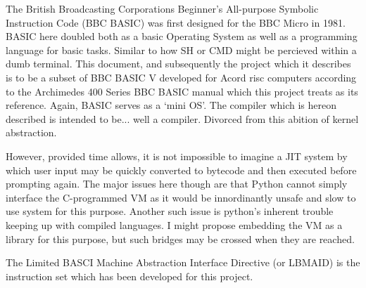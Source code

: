 
The British Broadcasting Corporations Beginner's All-purpose Symbolic Instruction Code (BBC BASIC) was first designed for the BBC Micro in 1981. BASIC
here doubled both as a basic Operating System as well as a programming language for basic tasks. Similar to how SH or CMD might be percieved within a dumb
terminal. This document, and subsequently the project which it describes is to be a subset of BBC BASIC V developed for Acord risc computers according
to the Archimedes 400 Series BBC BASIC manual which this project treats as its reference. Again, BASIC serves as a `mini OS'. The compiler which is
hereon described is intended to be... well a compiler. Divorced from this abition of kernel abstraction.

However, provided time allows, it is not impossible to imagine a JIT system by which user input may be quickly converted to bytecode and then executed
before prompting again. The major issues here though are that Python cannot simply interface the C-programmed VM as it would be innordinantly unsafe and
slow to use system for this purpose. Another such issue is python's inherent trouble keeping up with compiled languages. I might propose embedding the
VM as a library for this purpose, but such bridges may be crossed when they are reached.

The Limited BASCI Machine Abstraction Interface Directive (or LBMAID) is the instruction set which has been developed for this project. 




